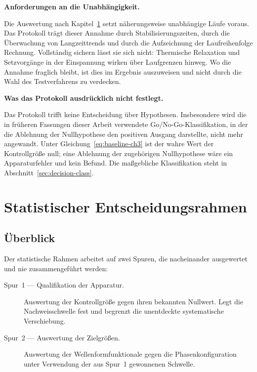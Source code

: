\documentclass[12pt,a4paper]{report}
\begin{document}
\vspace{0.5em}

\textbf{Anforderungen an die Unabhängigkeit.}

Die Auswertung nach Kapitel~\ref{chap:statistik} setzt näherungsweise
unabhängige Läufe voraus. Das Protokoll trägt dieser Annahme durch
Stabilisierungszeiten, durch die Überwachung von Langzeittrends und durch
die Aufzeichnung der Laufreihenfolge Rechnung. Vollständig sichern lässt
sie sich nicht: Thermische Relaxation und Setzvorgänge in der Einspannung
wirken über Laufgrenzen hinweg. Wo die Annahme fraglich bleibt, ist dies
im Ergebnis auszuweisen und nicht durch die Wahl des Testverfahrens zu
verdecken.

\vspace{0.5em}

\textbf{Was das Protokoll ausdrücklich nicht festlegt.}

Das Protokoll trifft keine Entscheidung über Hypothesen. Insbesondere
wird die in früheren Fassungen dieser Arbeit verwendete
Go/No-Go-Klassifikation, in der die Ablehnung der Nullhypothese den
positiven Ausgang darstellte, nicht mehr angewandt. Unter
Gleichung~\eqref{eq:baseline-ch3} ist der wahre Wert der Kontrollgröße
null; eine Ablehnung der zugehörigen Nullhypothese wäre ein
Apparaturfehler und kein Befund. Die maßgebliche Klassifikation steht in
Abschnitt~\ref{sec:decision-class}.



\chapter{Statistischer Entscheidungsrahmen}
\label{chap:statistik}

\section{Überblick}

Der statistische Rahmen arbeitet auf zwei Spuren, die nacheinander
ausgewertet und nie zusammengeführt werden:

\begin{description}
  \item[Spur~1 --- Qualifikation der Apparatur.] Auswertung der
        Kontrollgröße gegen ihren bekannten Nullwert. Legt die
        Nachweisschwelle fest und begrenzt die unentdeckte systematische
        Verschiebung.
  \item[Spur~2 --- Auswertung der Zielgrößen.] Auswertung der
        Wellenformfunktionale gegen die Phasenkonfiguration unter
        Verwendung der aus Spur~1 gewonnenen Schwelle.
\end{description}
\end{document}
